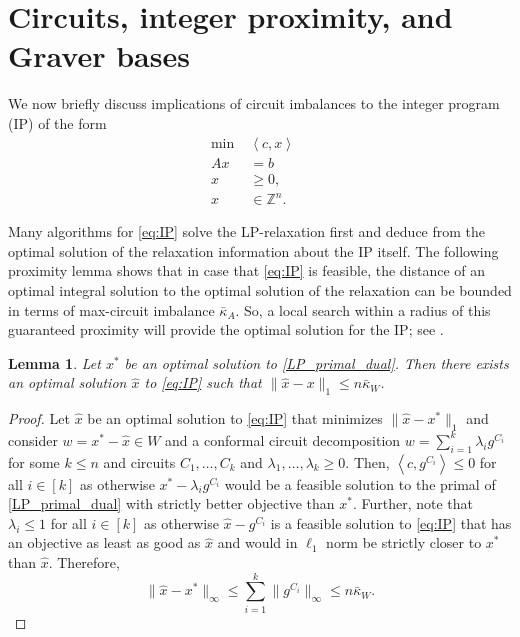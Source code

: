 \documentclass[11pt, a4paper]{article}
\newcommand{\pr}[2]{\left\langle #1, #2 \right\rangle}
\newcommand{\1}{\mathbbm{1}}
\newtheorem{lemma}[theorem]{Lemma}
\theoremstyle{case}
\newcommand{\Z}{\mathbb{Z}}
\begin{document}
 

\section{Circuits, integer proximity, and Graver bases}\label{sec:graver}
We now briefly discuss implications of circuit imbalances to the integer program (IP) of the form
\begin{equation}
\label{eq:IP} \tag{IP}
\begin{aligned}
\min \; &\pr{c}{x} \quad \\
Ax& =b \\
x &\geq 0, \\
x &\in \Z^n.
\end{aligned}
\end{equation}

Many algorithms for \eqref{eq:IP} solve the LP-relaxation first and deduce from the optimal solution of the relaxation information about the IP itself. The following proximity lemma shows that in case that \eqref{eq:IP} is feasible, the distance of an optimal integral solution to the optimal solution of the relaxation can be bounded in terms of max-circuit imbalance $\bar\kappa_A$. So, a local search within a radius of this guaranteed proximity will provide the optimal solution for the IP; see \cite[Proposition 4.1]{Lee89}.
\begin{lemma}\label{opt:IP}
Let $x^*$ be an optimal solution to \ref{LP_primal_dual}. Then there exists an optimal solution $\hat x$ to \eqref{eq:IP} such that $\|\hat x - x\|_1 \le n \bar\kappa_W$.
\end{lemma}
\begin{proof}
  Let $\hat x$ be an optimal solution to \eqref{eq:IP} that minimizes $\|\hat x - x^*\|_1$ and consider $w = x^* - \hat x \in W$ and a conformal circuit decomposition $w = \sum_{i = 1}^k \lambda_i g^{C_i}$ for some $k \le n$ and circuits $C_1, \ldots, C_k$ and $\lambda_1, \ldots, \lambda_k \ge 0$. Then, $\pr{c}{g^{C_i}} \le 0$ for all $i \in [k]$ as otherwise $x^* - \lambda_i g^{C_i}$ would be a feasible solution to the primal of \ref{LP_primal_dual} with strictly better objective than $x^*$. Further, note that $\lambda_i \le 1$ for all $i \in [k]$ as otherwise $\hat x - g^{C_i}$ is a feasible solution to \eqref{eq:IP} that has an objective as least as good as $\hat x$ and would in $\ell_1$ norm be strictly closer to $x^*$ than $\hat x$.   
  Therefore, 
  \[\|\hat x - x^*\|_\infty \leq \sum_{i = 1}^k \|g^{C_i}\|_\infty \le n\bar \kappa_W. \]
\end{proof}
\end{document}
